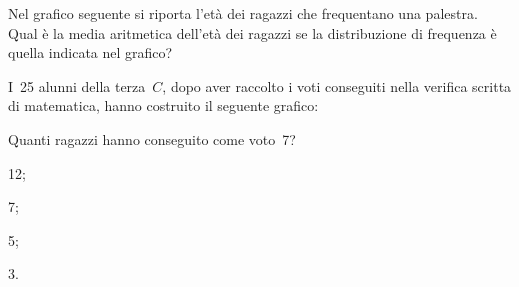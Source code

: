 \begin{esercizio}
\label{ese:A.55}
Nel grafico seguente si riporta l'età dei ragazzi che frequentano una palestra. Qual è la media aritmetica dell'età dei ragazzi
se la distribuzione di frequenza è quella indicata nel grafico?
\begin{center}
 
\end{center}
\end{esercizio}
\pagebreak
\begin{esercizio}
\label{ese:A.56}
I~25 alunni della terza~$C$, dopo aver raccolto i voti conseguiti
nella verifica scritta di matematica, hanno costruito il seguente grafico:
\begin{center}
 
\end{center}
Quanti ragazzi hanno conseguito come voto~7?
\begin{multicols}{4}
 \begin{enumeratea}
 \item 12;
 \item 7;
 \item 5;
 \item 3.
\end{enumeratea}
\end{multicols}
\end{esercizio}

